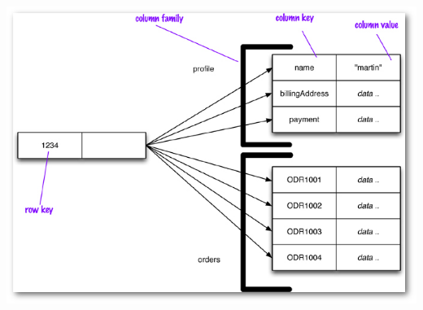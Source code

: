 \documentclass[14pt]{beamer}
\begin{document}
\begin{frame}[plain]
\includegraphics[width=\textwidth]{img/column}
\end{frame}
\end{document}
